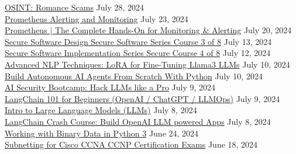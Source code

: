 \documentclass[10pt]{res} %
\begin{document}
\begin{resume}
\href{https://www.udemy.com/certificate/UC-d9e54618-f678-4572-8fd2-9266cf0d16a9}{\color{blue}OSINT: Romance Scams} \hfill July 28, 2024 \\
\href{https://www.udemy.com/certificate/UC-24e35e1d-8530-4671-9de7-92112cb92239}{\color{blue}Prometheus Alerting and Monitoring} \hfill July 23, 2024 \\
\href{https://www.udemy.com/certificate/UC-18735470-80b1-46c9-9475-2f879763f1fa}{\color{blue}Prometheus $|$ The Complete Hands-On for Monitoring \& Alerting} \hfill July 20, 2024 \\
\href{https://www.udemy.com/certificate/UC-22ff50c3-a3b0-41d1-8bf1-cf27d119f06b}{\color{blue}Secure Software Design Secure Software Series Course 3 of 8} \hfill July 13, 2024 \\
\href{https://www.udemy.com/certificate/UC-294a0792-54cc-4fe1-8f02-2fe51af9abe4}{\color{blue}Secure Software Implementation Series Secure Course 4 of 8} \hfill July 12, 2024 \\
\href{https://www.udemy.com/certificate/UC-74913df0-7b82-460a-98a3-98c18fa26061}{\color{blue}Advanced NLP Techniques: LoRA for Fine-Tuning Llama3 LLMs} \hfill July 10, 2024 \\
\href{https://www.udemy.com/certificate/UC-b83935a2-7954-48ef-b618-17753bfb3510}{\color{blue}Build Autonomous AI Agents From Scratch With Python} \hfill July 10, 2024 \\
\href{https://www.udemy.com/certificate/UC-bb9e94e9-366e-4cfd-bf8a-e7beb7f448b8}{\color{blue}AI Security Bootcamp: Hack LLMs like a Pro} \hfill July 9, 2024 \\
\href{https://www.udemy.com/certificate/UC-fb0cc1d0-c6a1-431d-ab38-a59dacc32410}{\color{blue}LangChain 101 for Beginners (OpenAI / ChatGPT / LLMOps)} \hfill July 9, 2024 \\
\href{https://www.udemy.com/certificate/UC-5860e7df-b6bc-4fd9-9630-79bc13278337}{\color{blue}Intro to Large Language Models (LLMs)} \hfill July 8, 2024 \\
\href{https://www.udemy.com/certificate/UC-d184fcf1-eb0b-47bb-b3ef-5ac67f5f76ba}{\color{blue}LangChain Crash Course: Build OpenAI LLM powered Apps} \hfill July 8, 2024 \\
\href{https://www.udemy.com/certificate/UC-8b60dca2-9fb1-4b38-a697-709ad3681e79}{\color{blue}Working with Binary Data in Python 3} \hfill June 24, 2024 \\
\href{https://www.udemy.com/certificate/UC-7dba2bf9-8740-4be7-bafb-c9577f52e5fa}{\color{blue}Subnetting for Cisco CCNA CCNP Certification Exams} \hfill June 18, 2024 \\

\end{resume}
\end{document}
